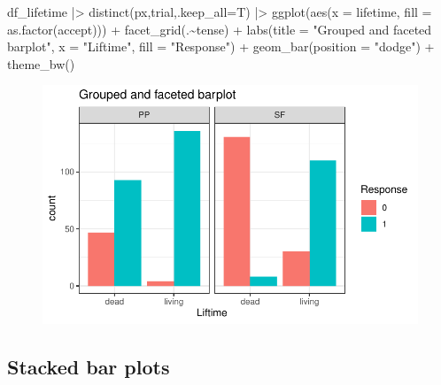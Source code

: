 \documentclass[
  letterpaper,
  DIV=11,
  numbers=noendperiod]{scrartcl}
\newenvironment{Shaded}{\begin{snugshade}}{\end{snugshade}}
\newcommand{\AttributeTok}[1]{\textcolor[rgb]{0.40,0.45,0.13}{#1}}
\newcommand{\FunctionTok}[1]{\textcolor[rgb]{0.28,0.35,0.67}{#1}}
\newcommand{\NormalTok}[1]{\textcolor[rgb]{0.00,0.23,0.31}{#1}}
\newcommand{\SpecialCharTok}[1]{\textcolor[rgb]{0.37,0.37,0.37}{#1}}
\newcommand{\StringTok}[1]{\textcolor[rgb]{0.13,0.47,0.30}{#1}}
\begin{document}
\begin{Shaded}
\begin{Highlighting}[]
\NormalTok{df\_lifetime }\SpecialCharTok{|\textgreater{}} 
  \FunctionTok{distinct}\NormalTok{(px,trial,}\AttributeTok{.keep\_all=}\NormalTok{T) }\SpecialCharTok{|\textgreater{}} 
  \FunctionTok{ggplot}\NormalTok{(}\FunctionTok{aes}\NormalTok{(}\AttributeTok{x =}\NormalTok{ lifetime, }\AttributeTok{fill =} \FunctionTok{as.factor}\NormalTok{(accept))) }\SpecialCharTok{+}
  \FunctionTok{facet\_grid}\NormalTok{(.}\SpecialCharTok{\textasciitilde{}}\NormalTok{tense) }\SpecialCharTok{+}
  \FunctionTok{labs}\NormalTok{(}\AttributeTok{title =} \StringTok{"Grouped and faceted barplot"}\NormalTok{,}
       \AttributeTok{x =} \StringTok{"Liftime"}\NormalTok{,}
       \AttributeTok{fill =} \StringTok{"Response"}\NormalTok{) }\SpecialCharTok{+}
  \FunctionTok{geom\_bar}\NormalTok{(}\AttributeTok{position =} \StringTok{"dodge"}\NormalTok{) }\SpecialCharTok{+}
  \FunctionTok{theme\_bw}\NormalTok{()}
\end{Highlighting}
\end{Shaded}

\begin{figure}[H]

{\centering \includegraphics{_data_viz_files/figure-pdf/unnamed-chunk-40-1.pdf}

}

\end{figure}

\hypertarget{stacked-bar-plots}{%
\subsection{Stacked bar plots}\label{stacked-bar-plots}}
\end{document}
